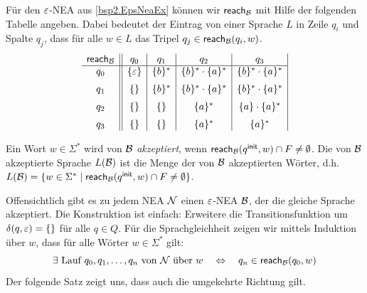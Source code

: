 Für den $\varepsilon$-NEA aus \autoref{bsp2.EpsNeaEx} können wir $\textsf{reach}_{\mathcal{B}}$ mit Hilfe der folgenden Tabelle angeben.
Dabei bedeutet der Eintrag von einer Sprache $L$ in Zeile $q_i$ und Spalte $q_j$, dass für alle $w\in L$ das Tripel
$q_j \in \textsf{reach}_{\mathcal{B}}(q_i,w)$.
\[
\begin{array}{c||c|c|c|c|c|c}
   \textsf{reach}_{\mathcal{B}}  & q_0 & q_1 & q_2 & q_3\\ \hline
q_0 & \{\varepsilon\} & \{b\}^* & \{b\}^*\cdot\{a\}^* & \{b\}^*\cdot\{a\}^* \\[2mm]
q_1 & \{\}     & \{b\}^* & \{b\}^*\cdot\{a\}^* & \{b\}^*\cdot\{a\}^* \\[2mm]
q_2 & \{\}     & \{\}    & \{a\}^*             & \{a\}\cdot\{a\}^*\\[2mm]
q_3 & \{\}     & \{\}    & \{a\}^*             & \{a\}^*
\end{array}
\]



\begin{Def}\label{def:2.EpsNeaSprache}
 Ein Wort $w\in\Sigma^*$ wird von $\mathcal{B}$ \emph{akzeptiert}, wenn $\textsf{reach}_{\mathcal{B}}(q^\mathsf{init},w) \cap F \ne \emptyset$.
 Die von $\mathcal{B}$ akzeptierte Sprache $L(\mathcal{B})$ ist die Menge der von $\mathcal{B}$ akzeptierten Wörter, d.h.\
	$L(\mathcal{B})=\{ w\in\Sigma^* \mid \textsf{reach}_{\mathcal{B}}(q^\mathsf{init},w) \cap F \ne \emptyset \}$.
\end{Def}

Offensichtlich gibt es zu jedem \ac{NEA} $\mathcal{N}$ einen $\varepsilon$-NEA $\mathcal{B}$, der die gleiche Sprache akzeptiert.
Die Konstruktion ist einfach: Erweitere die Transitionsfunktion um $\delta(q,\varepsilon)=\{\}$ für alle $q\in Q$.
Für die Sprachgleichheit zeigen wir mittels Induktion über $w$, dass für alle Wörter $w \in \Sigma^*$ gilt:
$$\exists \text{ Lauf } q_0,q_1,\ldots, q_n \text{ von $\mathcal{N}$ über } w \quad\Leftrightarrow\quad q_n \in \textsf{reach}_{\mathcal{B}}(q_0,w)$$
Der folgende Satz zeigt uns, dass auch die umgekehrte Richtung gilt.

